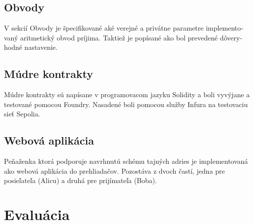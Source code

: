 \begin{otherlanguage}{slovak}
\subsection{Obvody}

V sekcií Obvody je špecifikované aké verejné a privátne parametre implementovaný
aritmetický obvod príjima. Taktiež je popísané ako bol prevedené dôveryhodné
nastavenie.

\subsection{Múdre kontrakty}

Múdre kontrakty sú napísane v programovacom jazyku Solidity a boli vyvýjane a
testované pomocou Foundry. Nasadené boli pomocou služby Infura na testovaciu
sieť Sepolia.

\subsection{Webová aplikácia}

Peňaženka ktorá podporuje navrhnutú schému tajných adries je implementovaná ako
webová aplikácia do prehliadačov. Pozostáva z dvoch častí, jedna pre posieľateľa
(Alicu) a druhá pre prijímateľa (Boba).

\section{Evaluácia}


\end{otherlanguage}
